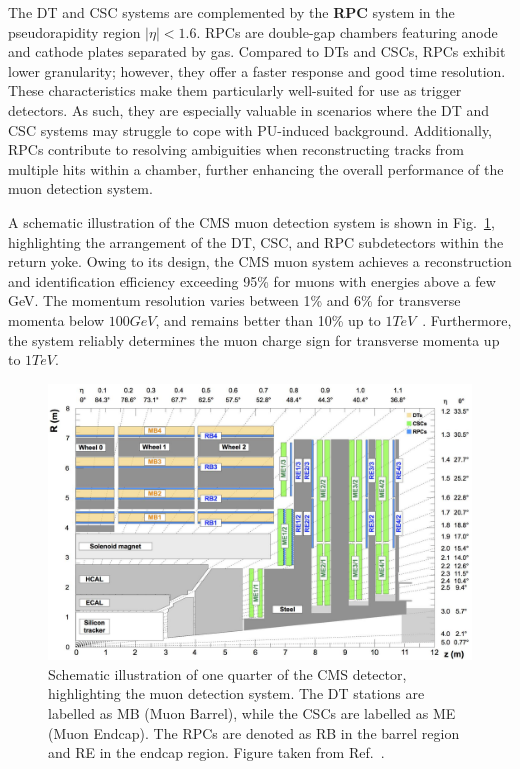 The \ac{DT} and \ac{CSC} systems are complemented by the \textbf{\ac{RPC}} system in the pseudorapidity region $|\eta| < 1.6$. RPCs are double-gap chambers featuring anode and cathode plates separated by gas. Compared to \acp{DT} and \acp{CSC}, \acp{RPC} exhibit lower granularity; however, they offer a faster response and good time resolution. These characteristics make them particularly well-suited for use as trigger detectors. As such, they are especially valuable in scenarios where the \ac{DT} and \ac{CSC} systems may struggle to cope with \ac{PU}-induced background. Additionally, RPCs contribute to resolving ambiguities when reconstructing tracks from multiple hits within a chamber, further enhancing the overall performance of the muon detection system.

A schematic illustration of the \ac{CMS} muon detection system is shown in Fig.~\ref{Figure:Chapter3_CMS_Muon_System}, highlighting the arrangement of the \ac{DT}, \ac{CSC}, and \ac{RPC} subdetectors within the return yoke. Owing to its design, the \ac{CMS} muon system achieves a reconstruction and identification efficiency exceeding 95\% for muons with energies above a few GeV. The momentum resolution varies between 1\% and 6\% for transverse momenta below $100\unit{GeV}$, and remains better than 10\% up to $1\unit{TeV}$~\cite{CMS_Muon_System_Performance_2}. Furthermore, the system reliably determines the muon charge sign for transverse momenta up to $1\unit{TeV}$.


\begin{figure}[!htbp]
\centering
\includegraphics[width= 1.0\textwidth]{Figures/Chapter3/CMS_Muon_System.pdf}
\caption[Schematic of CMS muon detection system]{Schematic illustration of one quarter of the \ac{CMS} detector, highlighting the muon detection system. The \ac{DT} stations are labelled as MB (Muon Barrel), while the \acp{CSC} are labelled as ME (Muon Endcap). The RPCs are denoted as RB in the barrel region and RE in the endcap region. Figure taken from Ref.~\cite{CMS_Muon_System_Performance}.}
\label{Figure:Chapter3_CMS_Muon_System}
\end{figure}

